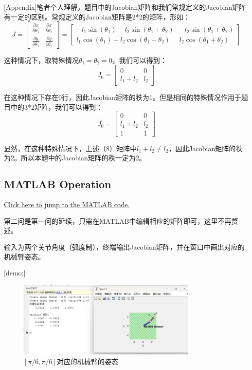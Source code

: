 \documentclass{ctexart}
\begin{document}
[Appendix]笔者个人理解，题目中的Jacobian矩阵和我们常规定义的Jacobian矩阵有一定的区别。常规定义的Jacobian矩阵是2*2的矩阵，形如：
\begin{equation}
	J = \begin{bmatrix}
		\frac{\partial x}{\partial \theta_1} & \frac{\partial x}{\partial \theta_2} \\
		\frac{\partial y}{\partial \theta_1} & \frac{\partial y}{\partial \theta_2}
	\end{bmatrix}
	= \begin{bmatrix}
		-l_1 \sin(\theta_1) - l_2 \sin(\theta_1 + \theta_2) & -l_2 \sin(\theta_1 + \theta_2) \\
		l_1 \cos(\theta_1) + l_2 \cos(\theta_1 + \theta_2) & l_2 \cos(\theta_1 + \theta_2)
	\end{bmatrix}
\end{equation}

这种情况下，取特殊情况$\theta_1 = \theta_2 = 0$，我们可以得到：
\begin{equation}
	J_{0} = \begin{bmatrix}
		0 & 0 \\
		l_1+l_2 & l_2
	\end{bmatrix}
\end{equation}

在这种情况下存在0行，因此Jacobian矩阵的秩为1。但是相同的特殊情况作用于题目中的3*2矩阵，我们可以得到：
\begin{equation}
	J_{0}^\prime = \begin{bmatrix}
		0 & 0 \\
		l_1+l_2 & l_2 \\
		1 & 1
	\end{bmatrix}
\end{equation}

显然，在这种特殊情况下，上述（8）矩阵中$l_1+l_2 \neq l_2$，因此Jacobian矩阵的秩为2。所以本题中的Jacobian矩阵的秩一定为2。

\subsection{MATLAB Operation}
\href{src/Rhw1_2_main.m}{Click here to jump to the MATLAB code.}

第二问是第一问的延续，只需在MATLAB中编辑相应的矩阵即可，这里不再赘述。

输入为两个关节角度（弧度制），终端输出Jacobian矩阵，并在窗口中画出对应的机械臂姿态。

[demo:]
\begin{figure}[h]
	\centering
	\includegraphics[width=0.8\textwidth]{Image/2.png}
	\caption{$[\pi/6,\pi/6]$对应的机械臂的姿态}
\end{figure}
\end{document}
